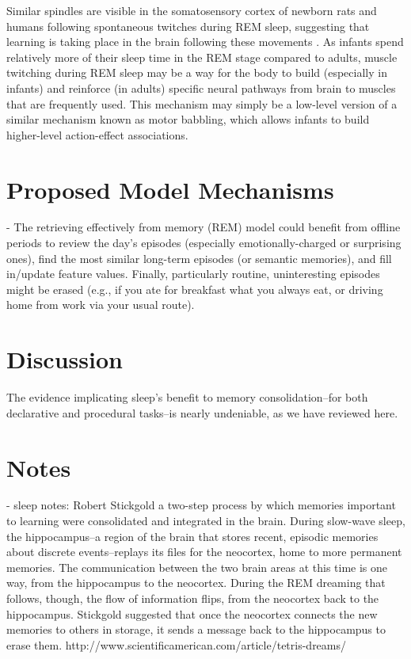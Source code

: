 \documentclass[10pt,letterpaper]{article}
\begin{document}
Similar spindles are visible in the somatosensory cortex of newborn rats and humans following spontaneous twitches during REM sleep, suggesting that learning is taking place in the brain following these movements \cite{Khazipov:2004}. As infants spend relatively more of their sleep time in the REM stage compared to adults, muscle twitching during REM sleep may be a way for the body to build (especially in infants) and reinforce (in adults) specific neural pathways from brain to muscles that are frequently used. This mechanism may simply be a low-level version of a similar mechanism known as motor babbling, which allows infants to build higher-level action-effect associations.

\section{Proposed Model Mechanisms}

- The retrieving effectively from memory (REM) model \cite{Shiffrin:1997} could benefit from offline periods to review the day's episodes (especially emotionally-charged or surprising ones), find the most similar long-term episodes (or semantic memories), and fill in/update feature values. Finally, particularly routine, uninteresting episodes might be erased (e.g., if you ate for breakfast what you always eat, or driving home from work via your usual route).


\section{Discussion}

The evidence implicating sleep's benefit to memory consolidation--for both declarative and procedural tasks--is nearly undeniable, as we have reviewed here.

\section{Notes}

- sleep notes: Robert Stickgold 
a two-step process by which memories important to learning were consolidated and integrated in the brain. During slow-wave sleep, the hippocampus--a region of the brain that stores recent, episodic memories about discrete events--replays its files for the neocortex, home to more permanent memories. The communication between the two brain areas at this time is one way, from the hippocampus to the neocortex. During the REM dreaming that follows, though, the flow of information flips, from the neocortex back to the hippocampus. Stickgold suggested that once the neocortex connects the new memories to others in storage, it sends a message back to the hippocampus to erase them.
http://www.scientificamerican.com/article/tetris-dreams/
\end{document}
